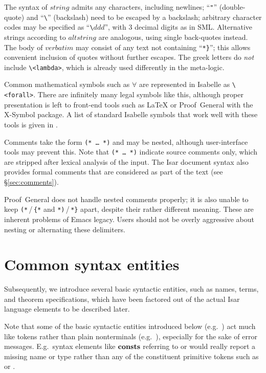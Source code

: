The syntax of $string$ admits any characters, including newlines;
``\verb|"|'' (double-quote) and ``\verb|\|'' (backslash) need to be
escaped by a backslash; arbitrary character codes may be specified as
``\verb|\|$ddd$'', with 3 decimal digits as in SML.  Alternative
strings according to $altstring$ are analogous, using single
back-quotes instead.  The body of $verbatim$ may consist of any text
not containing ``\verb|*}|''; this allows convenient inclusion of
quotes without further escapes.  The greek letters do \emph{not}
include \verb,\<lambda>,, which is already used differently in the
meta-logic.

Common mathematical symbols such as $\forall$ are represented in Isabelle as
\verb,\<forall>,.  There are infinitely many legal symbols like this, although
proper presentation is left to front-end tools such as {\LaTeX} or
Proof~General with the X-Symbol package.  A list of standard Isabelle symbols
that work well with these tools is given in \cite[appendix~A]{isabelle-sys}.

Comments take the form \texttt{(*~\dots~*)} and may be nested, although
user-interface tools may prevent this.  Note that \texttt{(*~\dots~*)}
indicate source comments only, which are stripped after lexical analysis of
the input.  The Isar document syntax also provides formal comments that are
considered as part of the text (see \S\ref{sec:comments}).

\begin{warn}
  Proof~General does not handle nested comments properly; it is also unable to
  keep \verb,(*,\,/\,\verb,{*, and \verb,*),\,/\,\verb,*}, apart, despite
  their rather different meaning.  These are inherent problems of Emacs
  legacy.  Users should not be overly aggressive about nesting or alternating
  these delimiters.
\end{warn}


\section{Common syntax entities}

Subsequently, we introduce several basic syntactic entities, such as names,
terms, and theorem specifications, which have been factored out of the actual
Isar language elements to be described later.

Note that some of the basic syntactic entities introduced below (e.g.\
) act much like tokens rather than plain nonterminals (e.g.\
), especially for the sake of error messages.  E.g.\ syntax
elements like ${\mathord{\mathbf{consts}}}$ referring to \railqtok{name} or \railqtok{type} would
really report a missing name or type rather than any of the constituent
primitive tokens such as \railtok{ident} or \railtok{string}.


